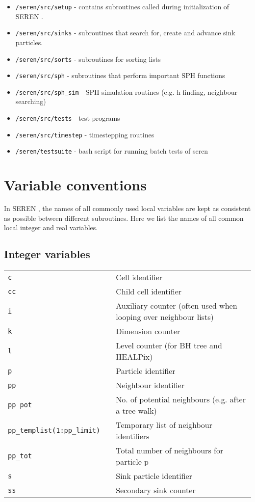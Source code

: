 \documentclass[a4paper]{article}
\newcommand{\NAME}{SEREN }
\newcommand{\name}{seren}
\newcommand{\var}[1]{\texttt{#1}}
\begin{document}
\begin{itemize}
\item \var{/\name/src/setup} - contains subroutines called during initialization of \NAME .
\item \var{/\name/src/sinks} - subroutines that search for, create and 
advance sink particles. 
\item \var{/\name/src/sorts} - subroutines for sorting lists
\item \var{/\name/src/sph} - subroutines that perform important SPH functions 
\item \var{/\name/src/sph\_sim} - SPH simulation routines
(e.g. h-finding, neighbour searching)  
\item \var{/\name/src/tests} - test programs
\item \var{/\name/src/timestep} - timestepping routines
\item \var{/\name/testsuite} - bash script for running batch tests of seren
\end{itemize}


\section{Variable conventions}
In \NAME, the names of all commonly used local variables are kept as 
consistent as possible between different subroutines.  
Here we list the names of all common local integer and real variables.  

\subsection{Integer variables}
\begin{tabular}{lll}
\var{c}  &  &  Cell identifier \\
\var{cc} &  &  Child cell identifier \\
\var{i}  &  &  Auxiliary counter (often used when looping over neighbour lists) \\
\var{k}  &  &  Dimension counter \\
\var{l}  &  &  Level counter (for BH tree and HEALPix) \\
\var{p}  &  &  Particle identifier  \\
\var{pp} &  &  Neighbour identifier \\
\var{pp\_pot} & & No. of potential neighbours (e.g. after a tree walk) \\
\var{pp\_templist(1:pp\_limit)} &  & Temporary list of neighbour identifiers \\
\var{pp\_tot} & & Total number of neighbours for particle p \\
\var{s}  &  &  Sink particle identifier \\
\var{ss} &  &  Secondary sink counter
\end{tabular}
\end{document}
